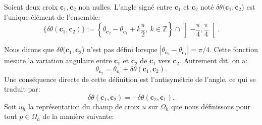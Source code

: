 \begin{definition}
Soient deux croix $\mathbf{c}_1,\mathbf{c}_2$ non nulles. L'angle signé entre $\mathbf{c}_1$ et $\mathbf{c}_2$ noté $\delta\theta(\mathbf{c}_1,\mathbf{c}_2$) est l'unique élément de l'ensemble:
$$
\{\delta\theta(\mathbf{c}_1,\mathbf{c}_2)\}:=\left\{\theta_{\mathbf{c}_2}-\theta_{\mathbf{c}_1}+k\frac{\pi}{2},~k\in\mathbb{Z}\right\}\cap\left]-\frac{\pi}{4}, \frac{\pi}{4}\right[.
$$
\end{definition}
Nous dirons que $\delta\theta(\mathbf{c}_1,\mathbf{c}_2$) n'est pas défini lorsque $|\theta_{\mathbf{c}_2}-\theta_{\mathbf{c}_1}|=\pi/4$. Cette fonction mesure la variation angulaire entre $\mathbf{c}_1$ et $\mathbf{c}_2$ de $\mathbf{c}_1$ vers $\mathbf{c}_2$. Autrement dit, on a:
$$
\theta_{\mathbf{c}_2}=\theta_{\mathbf{c}_1}+\delta\theta(\mathbf{c}_1,\mathbf{c}_2).
$$
Une conséquence directe de cette définition est l'antisymétrie de l'angle, ce qui se traduit par:
$$
\delta\theta(\mathbf{c}_1, \mathbf{c}_2)=-\delta\theta(\mathbf{c}_2,\mathbf{c}_1).
$$
Soit $\bar{u}_h$ la représentation du champ de croix $\bar{u}$ sur $\Omega_h$ que nous définissons pour tout $p\in\Omega_h$ de la manière suivante:\\
